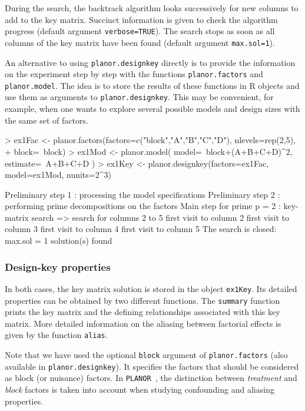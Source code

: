 \documentclass[a4paper]{article}
\newcommand{\PLANOR}{\texttt{PLANOR }}
\begin{document}
During the search, the backtrack algorithm looks successively for new
columns to add to the key matrix. Succinct information is given to
check the algorithm progress (default argument
\texttt{verbose=TRUE}). The search stops as soon as all columns of the
key matrix have been found (default argument \texttt{max.sol=1}).

An alternative to using \texttt{planor.designkey} directly is to
provide the information on the experiment step by step with
the functions \texttt{planor.factors} and \texttt{planor.model}. The
idea is to store the results of these functions in R objects and use
them as arguments to \texttt{planor.designkey}. This may be
convenient, for example, when one wants to explore several possible
models and design sizes with the same set of factors.
\begin{Schunk}
\begin{Sinput}
> ex1Fac <- planor.factors(factors=c("block","A","B","C","D"), nlevels=rep(2,5),
+                          block=~block)
> ex1Mod <- planor.model( model=~block+(A+B+C+D)^2, estimate=~A+B+C+D )
> ex1Key <- planor.designkey(factors=ex1Fac, model=ex1Mod, nunits=2^3)
\end{Sinput}
\begin{Soutput}
Preliminary step 1 : processing the model specifications
Preliminary step 2 : performing prime decompositions on the factors
Main step for prime p = 2 : key-matrix search
  => search for columns 2 to 5 
      first visit to column 2 
      first visit to column 3 
      first visit to column 4 
      first visit to column 5 
The search is closed: max.sol =  1 solution(s) found 
\end{Soutput}
\end{Schunk}

\subsubsection{Design-key properties}
In both cases, the key matrix solution is stored in the object
\texttt{ex1Key}. Its detailed properties can be obtained by two
different functions. The \texttt{summary} function prints the key
matrix and the defining relationships associated with this key
matrix. More detailed information on the aliasing between factorial
effects is given by the function \texttt{alias}.

Note that we have used the optional \texttt{block} argument of
\texttt{planor.factors} (also available in \texttt{planor.designkey}).
It specifies the factors that should be considered as block (or
nuisance) factors. In \PLANOR, the distinction between
\emph{treatment} and \emph{block} factors is taken into account when
studying confounding and aliasing properties.
\end{document}
